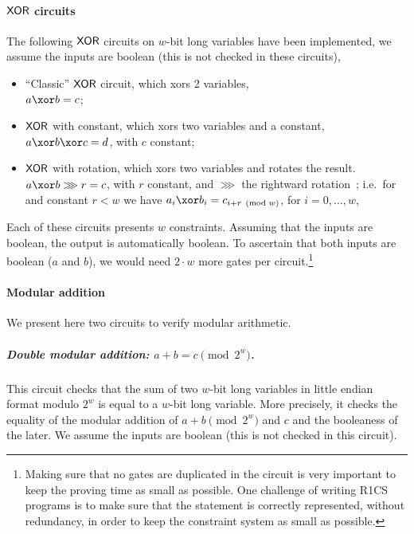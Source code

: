 \paragraph{$\mathsf{XOR}$ circuits}

The following $\mathsf{XOR}$ circuits on $w$-bit long variables have been implemented, we assume the inputs are boolean (this is not checked in these circuits),
\begin{itemize}
  \item ``Classic'' $\mathsf{XOR}$ circuit, which xors 2 variables,\\ $a \xor b = c$;
  \item $\mathsf{XOR}$ with constant, which xors two variables and a constant,\\ $a \xor b \xor c = d$, with $c$ constant;
  \item $\mathsf{XOR}$ with rotation, which xors two variables and rotates the result.\\
  $a \xor b \ggg r = c$, with $r$ constant, and $\ggg$ the rightward rotation~\cite[Section 2.3]{blakecompietf};
  i.e.~for and constant $r < w$ we have $a_i \xor b_i = c_{i+r \pmod w}$, for $i = 0, \ldots, w$,
\end{itemize}

Each of these circuits presents $w$ constraints. Assuming that the inputs are boolean, the output is automatically boolean. To ascertain that both inputs are boolean ($a$ and $b$), we would need $2\cdot w$ more gates per circuit.\footnote{Making sure that no gates are duplicated in the circuit is very important to keep the proving time as small as possible. One challenge of writing R1CS programs is to make sure that the statement is correctly represented, without redundancy, in order to keep the constraint system as small as possible.}


\paragraph{Modular addition}\label{implementation:efficiency:blake:helper-circuits:modular-addition}

We present here two circuits to verify modular arithmetic.

\subparagraph{Double modular addition: {\boldmath $a + b = c \pmod {2^w}$}.}

This circuit checks that the sum of two $w$-bit long variables in little endian format modulo ${2^w}$ is equal to a $w$-bit long variable. More precisely, it checks the equality of the modular addition of $a+b \pmod {2^w}$ and $c$ and the booleaness of the later. We assume the inputs are boolean (this is not checked in this circuit).

